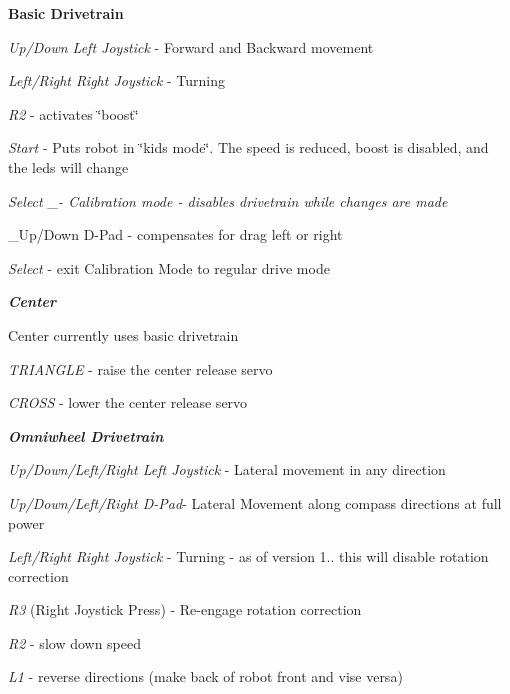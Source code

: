 \begin{DoxyItemize}
\item {\bfseries Basic Drivetrain}
\begin{DoxyItemize}
\item {\itshape Up/\+Down Left Joystick} -\/ Forward and Backward movement
\item {\itshape Left/\+Right Right Joystick} -\/ Turning
\item {\itshape R2} -\/ activates \char`\"{}boost\char`\"{}
\item {\itshape Start} -\/ Puts robot in \char`\"{}kids mode\char`\"{}. The speed is reduced, boost is disabled, and the leds will change
\item {\itshape Select \+\_\+-\/ Calibration mode -\/ disables drivetrain while changes are made
\begin{DoxyItemize}
\item \+\_\+\+Up/\+Down D-\/\+Pad -\/ compensates for drag left or right
\item {\itshape Select} -\/ exit Calibration Mode to regular drive mode
\end{DoxyItemize}}
\end{DoxyItemize}
\item {\itshape {\bfseries Center}
\begin{DoxyItemize}
\item Center currently uses basic drivetrain
\item {\itshape T\+R\+I\+A\+N\+G\+LE} -\/ raise the center release servo
\item {\itshape C\+R\+O\+SS} -\/ lower the center release servo
\end{DoxyItemize}}
\item {\itshape {\bfseries Omniwheel Drivetrain}
\begin{DoxyItemize}
\item {\itshape Up/\+Down/\+Left/\+Right Left Joystick} -\/ Lateral movement in any direction
\item {\itshape Up/\+Down/\+Left/\+Right D-\/\+Pad}-\/ Lateral Movement along compass directions at full power
\item {\itshape Left/\+Right Right Joystick} -\/ Turning -\/ as of version 1.. this will disable rotation correction
\item {\itshape R3} (Right Joystick Press) -\/ Re-\/engage rotation correction
\item {\itshape R2} -\/ slow down speed
\item {\itshape L1} -\/ reverse directions (make back of robot front and vise versa)

\end{DoxyItemize}}
\end{DoxyItemize}
